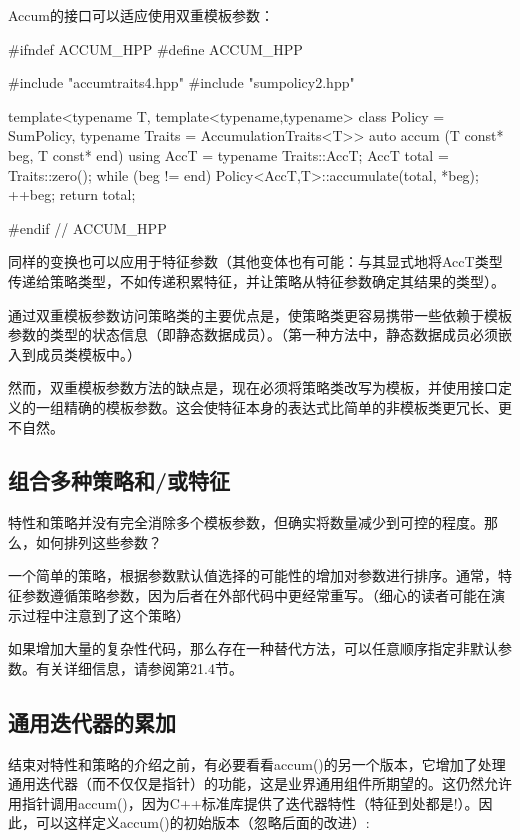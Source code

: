 Accum的接口可以适应使用双重模板参数：

\begin{cpp}
#ifndef ACCUM_HPP
#define ACCUM_HPP

#include "accumtraits4.hpp"
#include "sumpolicy2.hpp"

template<typename T,
		template<typename,typename> class Policy = SumPolicy,
		typename Traits = AccumulationTraits<T>>
auto accum (T const* beg, T const* end)
{
	using AccT = typename Traits::AccT;
	AccT total = Traits::zero();
	while (beg != end) {
		Policy<AccT,T>::accumulate(total, *beg);
		++beg;
	}
	return total;
}

#endif // ACCUM_HPP
\end{cpp}

同样的变换也可以应用于特征参数（其他变体也有可能：与其显式地将AccT类型传递给策略类型，不如传递积累特征，并让策略从特征参数确定其结果的类型）。

通过双重模板参数访问策略类的主要优点是，使策略类更容易携带一些依赖于模板参数的类型的状态信息（即静态数据成员）。（第一种方法中，静态数据成员必须嵌入到成员类模板中。）

然而，双重模板参数方法的缺点是，现在必须将策略类改写为模板，并使用接口定义的一组精确的模板参数。这会使特征本身的表达式比简单的非模板类更冗长、更不自然。

\subsection{组合多种策略和/或特征}

特性和策略并没有完全消除多个模板参数，但确实将数量减少到可控的程度。那么，如何排列这些参数？

一个简单的策略，根据参数默认值选择的可能性的增加对参数进行排序。通常，特征参数遵循策略参数，因为后者在外部代码中更经常重写。（细心的读者可能在演示过程中注意到了这个策略）

如果增加大量的复杂性代码，那么存在一种替代方法，可以任意顺序指定非默认参数。有关详细信息，请参阅第21.4节。

\subsection{通用迭代器的累加}

结束对特性和策略的介绍之前，有必要看看accum()的另一个版本，它增加了处理通用迭代器（而不仅仅是指针）的功能，这是业界通用组件所期望的。这仍然允许用指针调用accum()，因为C++标准库提供了迭代器特性（特征到处都是!）。因此，可以这样定义accum()的初始版本（忽略后面的改进）:

